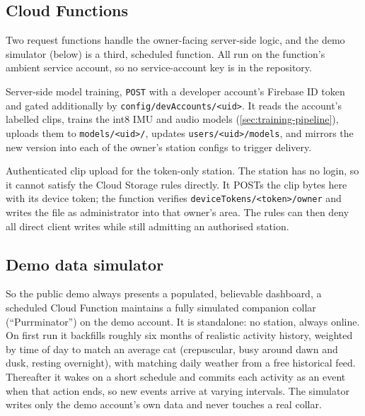 \subsection{Cloud Functions}

Two request functions handle the owner-facing server-side logic, and the demo simulator (below) is a
third, scheduled function. All run on the function's ambient service account, so no service-account
key is in the repository.

\begin{description}[leftmargin=1.6em,style=nextline]
  \item[\texttt{train}] Server-side model training, \texttt{POST} with a developer account's Firebase
        ID token and gated additionally by \texttt{config/devAccounts/<uid>}. It reads the account's
        labelled clips, trains the int8 IMU and audio models (\cref{sec:training-pipeline}), uploads
        them to \texttt{models/<uid>/}, updates \texttt{users/<uid>/models}, and mirrors the new
        version into each of the owner's station configs to trigger delivery.
  \item[\texttt{upload\_clip}] Authenticated clip upload for the token-only station. The station has
        no login, so it cannot satisfy the Cloud Storage rules directly. It POSTs the clip bytes here
        with its device token; the function verifies \texttt{deviceTokens/<token>/owner} and writes the
        file as administrator into that owner's area. The rules can then deny all direct client writes
        while still admitting an authorised station.
\end{description}

\subsection{Demo data simulator}

So the public demo always presents a populated, believable dashboard, a scheduled Cloud Function
maintains a fully simulated companion collar (``Purrminator'') on the demo account. It is standalone:
no station, always online. On first run it backfills roughly six months of realistic activity history,
weighted by time of day to match an average cat (crepuscular, busy around dawn and dusk, resting
overnight), with matching daily weather from a free historical feed. Thereafter it wakes on a short
schedule and commits each activity as an event when that action ends, so new events arrive at varying
intervals. The simulator writes only the demo account's own data and never touches a real collar.

